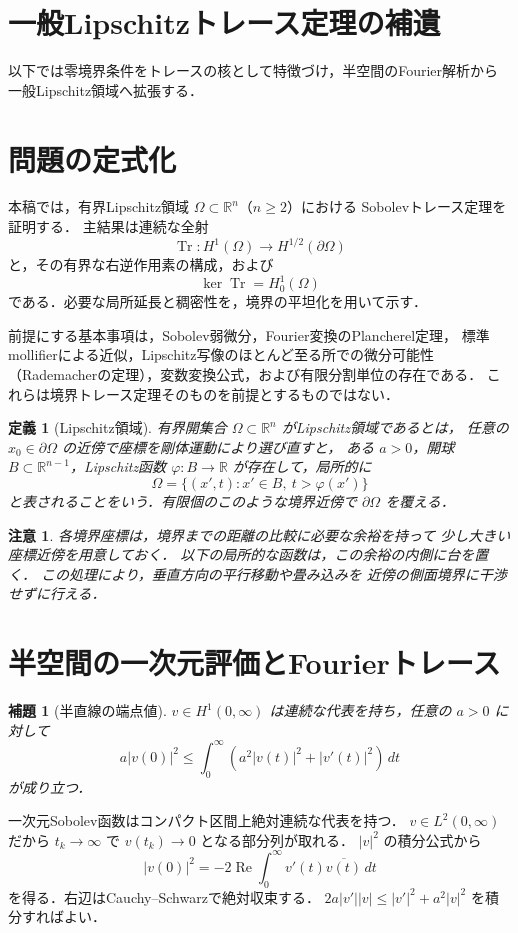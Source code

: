 \documentclass[a5paper,10pt,onecolumn]{jsarticle}
\makeatletter
\theoremstyle{mathnotetheorem}
\newtheorem{definition}[theorem]{定義}
\newtheorem{lemma}[theorem]{補題}
\newtheorem{remark}[theorem]{注意}
\renewcommand{\proofname}{証明}
\renewenvironment{proof}[1][\proofname]{%
  \par\pushQED{\qed}\normalfont\topsep4\p@\@plus2\p@\relax
  \trivlist\item[\hskip\labelsep\bfseries #1]\ignorespaces
}{\popQED\endtrivlist\@endpefalse}
\makeatother
\begin{document}
\section{一般Lipschitzトレース定理の補遺}
以下では零境界条件をトレースの核として特徴づけ，半空間のFourier解析から一般Lipschitz領域へ拡張する．

\section{問題の定式化}
本稿では，有界Lipschitz領域 $\Omega\subset\mathbb R^n$（$n\ge2$）における
Sobolevトレース定理を証明する．
主結果は連続な全射
\[
 \operatorname{Tr}:H^1(\Omega)\longrightarrow H^{1/2}(\partial\Omega)
\]
と，その有界な右逆作用素の構成，および
\[
 \ker\operatorname{Tr}=H_0^1(\Omega)
\]
である．必要な局所延長と稠密性を，境界の平坦化を用いて示す．

前提にする基本事項は，Sobolev弱微分，Fourier変換のPlancherel定理，
標準mollifierによる近似，Lipschitz写像のほとんど至る所での微分可能性
（Rademacherの定理），変数変換公式，および有限分割単位の存在である．
これらは境界トレース定理そのものを前提とするものではない．

\begin{definition}[Lipschitz領域]
有界開集合 $\Omega\subset\mathbb R^n$ がLipschitz領域であるとは，
任意の $x_0\in\partial\Omega$ の近傍で座標を剛体運動により選び直すと，
ある $a>0$，開球 $B\subset\mathbb R^{n-1}$，Lipschitz函数
$\varphi:B\to\mathbb R$ が存在して，局所的に
\[
 \Omega=\{(x',t):x'\in B,\ t>\varphi(x')\}
\]
と表されることをいう．有限個のこのような境界近傍で
$\partial\Omega$ を覆える．
\end{definition}

\begin{remark}
各境界座標は，境界までの距離の比較に必要な余裕を持って
少し大きい座標近傍を用意しておく．
以下の局所的な函数は，この余裕の内側に台を置く．
この処理により，垂直方向の平行移動や畳み込みを
近傍の側面境界に干渉せずに行える．
\end{remark}

\section{半空間の一次元評価とFourierトレース}
\begin{lemma}[半直線の端点値]
$v\in H^1(0,\infty)$ は連続な代表を持ち，任意の $a>0$ に対して
\[
 a|v(0)|^2\le\int_0^\infty(a^2|v(t)|^2+|v'(t)|^2)\,dt
\]
が成り立つ．
\end{lemma}
\begin{proof}
一次元Sobolev函数はコンパクト区間上絶対連続な代表を持つ．
$v\in L^2(0,\infty)$ だから $t_k\to\infty$ で
$v(t_k)\to0$ となる部分列が取れる．
$|v|^2$ の積分公式から
\[
 |v(0)|^2=-2\operatorname{Re}\int_0^\infty
     v'(t)\overline{v(t)}\,dt
\]
を得る．右辺はCauchy--Schwarzで絶対収束する．
$2a|v'||v|\le|v'|^2+a^2|v|^2$ を積分すればよい．
\end{proof}
\end{document}
